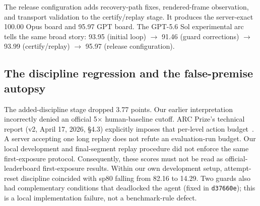 \documentclass[11pt]{article}
\begin{document}
\begin{table}[ht]
  \centering
  \caption{Frozen experimental stages, mechanisms, and composites (Claude Opus 5, all 25 public games).}
  \label{tab:ladder}
\end{table}

The release configuration adds recovery-path fixes, rendered-frame observation, and transport validation to the certify/replay stage. It produces the server-exact 100.00 Opus board and 95.97 GPT board. The GPT-5.6 Sol experimental arc tells the same broad story: 93.95 (initial loop) ${\to}$ 91.46 (guard corrections) ${\to}$ 93.99 (certify/replay) ${\to}$ 95.97 (release configuration).

\subsection{The discipline regression and the false-premise autopsy}\label{sec:disciplineautopsy}

The added-discipline stage dropped 3.77 points. Our earlier interpretation incorrectly denied an official 5$\times$ human-baseline cutoff. ARC Prize's technical report (v2, April 17, 2026, \S4.3) explicitly imposes that per-level action budget~\citep{arcagi3}. A server accepting one long replay does not refute an evaluation-run budget. Our local development and final-segment replay procedure did not enforce the same first-exposure protocol. Consequently, these scores must not be read as official-leaderboard first-exposure results. Within our own development setup, attempt-reset discipline coincided with sp80 falling from 82.16 to 14.29. Two guards also had complementary conditions that deadlocked the agent (fixed in \texttt{d37660e}); this is a local implementation failure, not a benchmark-rule defect.
\end{document}

